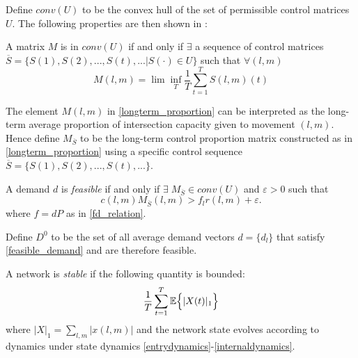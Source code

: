 Define $conv(U)$ to be the convex hull of the set of permissible control matrices $U$. The following properties are then shown in \cite{MaxPressureStochastic}: 
\begin{Prop} A matrix 
$M$ is in $conv(U)$ if and only if $\exists$ a sequence of control matrices $\overline S = \{S(1),S(2),...,S(t),... \vert S(\cdot) \in U\}$ such that $\forall (l,m)$
\begin{equation}\label{longterm_proportion}
M(l,m) = \lim\inf_{T}\dfrac{1}{T}\sum_{t=1}^{T}S(l,m)(t)
\end{equation}
\end{Prop}
The element $M(l,m)$ in \eqref{longterm_proportion} can be interpreted as the long-term average proportion of intersection capacity given to movement $(l,m)$. Hence define $M_{\overline{S}}$ to be the long-term control proportion matrix constructed as in \eqref{longterm_proportion} using a specific control sequence $\overline{S} = \{S(1),S(2),...,S(t),...\}$. 
\begin{Prop} \label{feasible_property}
A demand $d$ is \emph{feasible} if and only if  $\exists \; M_{\overline S} \in conv(U)$ and $ \varepsilon > 0$ such that
 \begin{equation}  \label{feasible_demand} 
 c(l,m)M_{\overline S}(l,m) > f_{l}r(l,m) + \varepsilon. 
 \end{equation}
 where $f = dP$ as in \eqref{fd_relation}. 
\end{Prop}
Define $D^0$ to be the set of all average demand vectors $d=\{d_l\}$ that satisfy \eqref{feasible_demand} and are therefore feasible.

A network is \emph{stable} if the following quantity is bounded:
\begin{equation} \label{stability_condition}
 \dfrac{1}{T}\sum_{t=1}^{T}\expectation{\vert X(t) \vert_{1}}
 \end{equation}
where $\vert X\vert_{1} = \sum_{l,m} \vert x(l,m)\vert$ and the network state evolves according to dynamics under state dynamics \eqref{entrydynamics}-\eqref{internaldynamics}.


